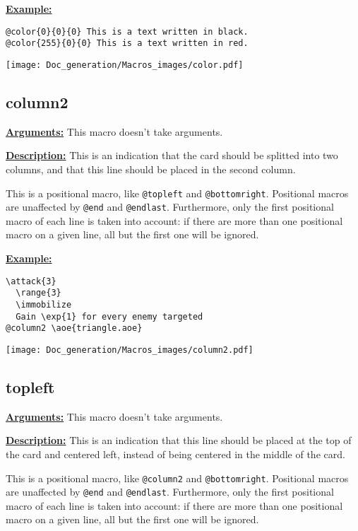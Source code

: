 \documentclass{article}
\begin{document}
\textbf{\underline{Example:}}

\begin{center}
\begin{BVerbatim}
@color{0}{0}{0} This is a text written in black.
@color{255}{0}{0} This is a text written in red.
\end{BVerbatim}

\texttt{[image: Doc\_generation/Macros\_images/color.pdf]}
\end{center}


\subsection{column2}
\textbf{\underline{Arguments:}} This macro doesn't take arguments.

\textbf{\underline{Description:}} This is an indication that the card should be splitted into two columns, and that this line should be placed in the second column.

This is a positional macro, like \verb`@topleft` and \verb`@bottomright`. Positional macros are unaffected by \verb`@end` and \verb`@endlast`. Furthermore, only the first positional macro of each line is taken into account: if there are more than one positional macro on a given line, all but the first one will be ignored.

\textbf{\underline{Example:}}

\begin{center}
\begin{BVerbatim}
\attack{3}
  \range{3}
  \immobilize
  Gain \exp{1} for every enemy targeted
@column2 \aoe{triangle.aoe}
\end{BVerbatim}

\texttt{[image: Doc\_generation/Macros\_images/column2.pdf]}
\end{center} 

\subsection{topleft}
\textbf{\underline{Arguments:}} This macro doesn't take arguments.

\textbf{\underline{Description:}} This is an indication that this line should be placed at the top of the card and centered left, instead of being centered in the middle of the card.

This is a positional macro, like \verb`@column2` and \verb`@bottomright`. Positional macros are unaffected by \verb`@end` and \verb`@endlast`. Furthermore, only the first positional macro of each line is taken into account: if there are more than one positional macro on a given line, all but the first one will be ignored.
\end{document}
